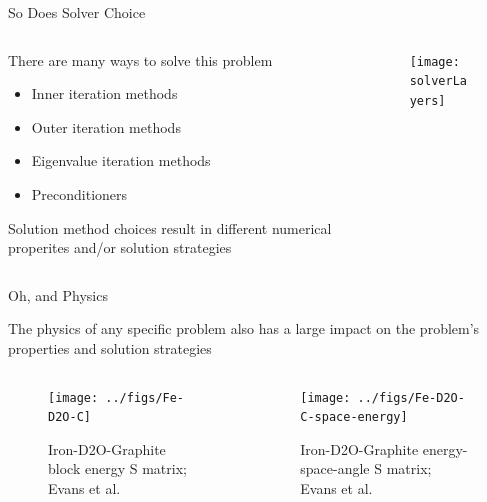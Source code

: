 \documentclass[xcolor=x11names,compress]{beamer}
\renewcommand{\(}{\begin{columns}}
\renewcommand{\)}{\end{columns}}
\newcommand{\<}[1]{\begin{column}{#1}}
\renewcommand{\>}{\end{column}}
\begin{document}
\begin{frame}{So Does Solver Choice}

    \begin{columns}
    \begin{column}{0.45\textwidth}
        There are many ways to \textcolor{dgreen}{solve} this problem
        \begin{itemize}
        \item Inner iteration methods
        \item Outer iteration methods
        \item Eigenvalue iteration methods
        \item Preconditioners
        \end{itemize}
    
        \textcolor{dgreen}{Solution} method choices result in different
        numerical properites and/or solution strategies
  	\end{column}
 	\begin{column}{0.45\textwidth}
 	   \begin{center}
 	   \begin{figure}
 	   \texttt{[image: solverLayers]}
       \end{figure}
 	   \end{center}
  	\end{column}
	\end{columns}
	
\end{frame}

\begin{frame}{Oh, and Physics}

    The physics of any specific problem also has a large impact on the
    problem's properties and solution strategies
    
    \begin{columns}
    \begin{column}{0.45\textwidth}
 	   \begin{center}
 	   \begin{figure}
 	   \texttt{[image: ../figs/Fe-D2O-C]}
 	   \caption{Iron-D2O-Graphite block energy S matrix; Evans et al.}
       \end{figure}
 	   \end{center}
  	\end{column}
 	\begin{column}{0.45\textwidth}
 	   \begin{center}
 	   \begin{figure}
 	   \texttt{[image: ../figs/Fe-D2O-C-space-energy]}
 	   \caption{Iron-D2O-Graphite energy-space-angle S matrix; Evans et al.}
       \end{figure}
 	   \end{center}
  	\end{column}
	\end{columns}
       
\end{frame}
\end{document}
